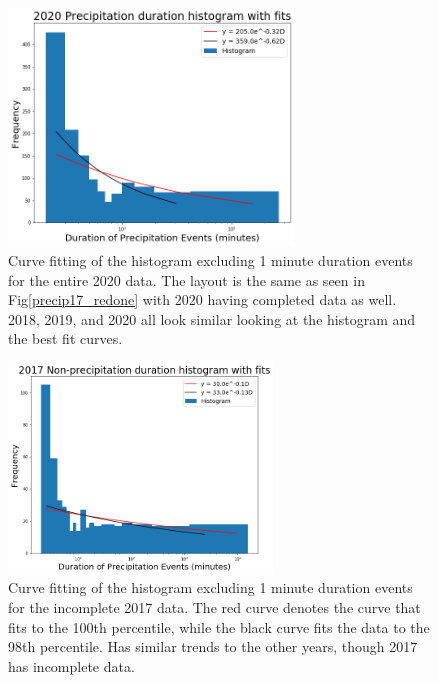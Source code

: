 \documentclass[11pt]{report}
\begin{document}
\begin{figure}[b]
\centering
\includegraphics[width=0.675\textwidth]{Figures/precip20_new.png}
\caption[2020 precipitation duration exponentials with contrasting curve fitting]
{\label{precip20_redone}Curve fitting of the histogram excluding 1
  minute duration events for the entire 2020 data. The layout is the same as
  seen in Fig\ref{precip17_redone} with 2020 having completed data as
  well. 2018, 2019, and 2020 all look similar looking at the histogram and
  the best fit curves.}
\end{figure}

\clearpage
\begin{figure}[t]
\centering
\includegraphics[width=0.625\textwidth]{Figures/nonprecip_2017_new.png}
\caption[2017 Non-precipitation duration Exponentials with contrasting curve fitting]

{\label{nonprecip17_redone}Curve fitting of the histogram excluding 1 minute
  duration events for the incomplete 2017 data. The red curve denotes the
  curve that fits to the 100th percentile, while the black curve fits the
  data to the 98th percentile. Has similar trends to the other years, though
  2017 has incomplete data.}
\end{figure}
\end{document}
